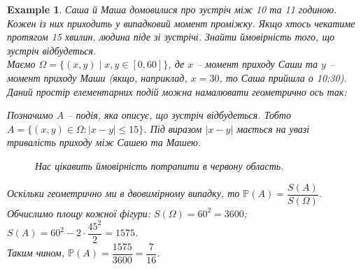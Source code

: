 \documentclass[a4paper, 10pt]{article}
\theoremstyle{theoremdd}
\newtheorem{example}[theorem]{Example}
\begin{document}
\begin{example}
Саша й Маша домовилися про зустріч між 10 та 11 годиною. Кожен із них приходить у випадковий момент проміжку. Якщо хтось чекатиме протягом 15 хвилин, людина піде зі зустрічі. Знайти ймовірність того, що зустріч відбудеться.\\
Маємо $\Omega = \{ (x,y) \mid x,y \in [0,60] \}$, де $x$ -- момент приходу Саши та $y$ -- момент приходу Маши (якщо, наприклад, $x = 30$, то Саша прийшла о 10:30). Даний простір елементарних подій можна намалювати геометрично ось так:
\begin{figure}[H]
\centering
{}
\end{figure}
\noindent
Позначимо $A$ -- подія, яка описує, що зустріч відбудеться. Тобто $A = \{ (x,y) \in \Omega : |x-y| \leq 15 \}$. Під виразом $|x-y|$ мається на увазі тривалість приходу між Сашею та Машею.
\begin{figure}[H]
\centering
{}
\caption*{Нас цікавить ймовірність потрапити в червону область.}
\end{figure}
\noindent
Оскільки геометрично ми в двовимірному випадку, то $\mathbb{P}(A) = \dfrac{S(A)}{S(\Omega)}$. Обчислимо площу кожної фігури: $S(\Omega) = 60^2 = 3600$; \qquad $S(A) = 60^2 - 2 \cdot \dfrac{45^2}{2} = 1575$.\\
Таким чином, $\mathbb{P}(A) = \dfrac{1575}{3600} = \dfrac{7}{16}$.
\end{example}
\end{document}
